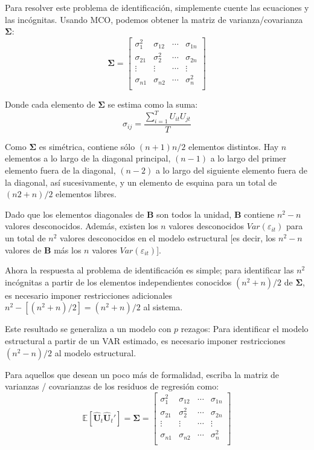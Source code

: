 \documentclass[
]{book}
\begin{document}
Para resolver este problema de identificación, simplemente cuente las ecuaciones y las incógnitas. Usando MCO, podemos obtener la matriz de varianza/covarianza \(\mathbf{\Sigma}\):
\begin{equation*}
    \mathbf{\Sigma} = 
    \begin{bmatrix}
    \sigma_1^2 & \sigma_{12} & \cdots & \sigma_{1n} \\ 
    \sigma_{21} & \sigma_2^2 & \cdots & \sigma_{2n} \\ 
    \vdots & \vdots & \cdots & \vdots \\ 
    \sigma_{n1} & \sigma_{n2} & \cdots & \sigma_n^2 \\ 
    \end{bmatrix}
\end{equation*}

Donde cada elemento de \(\mathbf{\Sigma}\) se estima como la suma:
\begin{equation*}
    \sigma_{ij} = \frac{\sum_{i = 1}^{T} U_{it} U_{jt} }{T}
\end{equation*}

Como \(\mathbf{\Sigma}\) es simétrica, contiene sólo \((n + 1)n/2\) elementos distintos. Hay \(n\) elementos a lo largo de la diagonal principal, \((n - 1)\) a lo largo del primer elemento fuera de la diagonal, \((n - 2)\) a lo largo del siguiente elemento fuera de la diagonal, así sucesivamente, y un elemento de esquina para un total de \((n2 + n)/2\) elementos libres.

Dado que los elementos diagonales de \(\mathbf{B}\) son todos la unidad, \(\mathbf{B}\) contiene \(n^2 - n\) valores desconocidos. Además, existen los \(n\) valores desconocidos \(Var(\varepsilon_{it})\) para un total de \(n^2\) valores desconocidos en el modelo estructural {[}es decir, los \(n^2 - n\) valores de \(\mathbf{B}\) más los \(n\) valores \(Var(\varepsilon_{it})\){]}.

Ahora la respuesta al problema de identificación es simple; para identificar las \(n^2\) incógnitas a partir de los elementos independientes conocidos \((n^2 + n)/2\) de \(\mathbf{\Sigma}\), es necesario imponer restricciones adicionales \(n^2 - [(n^2 + n)/2] = (n^2 + n)/2\) al sistema.

Este resultado se generaliza a un modelo con \(p\) rezagos: Para identificar el modelo estructural a partir de un VAR estimado, es necesario imponer restricciones \((n^2 - n)/2\) al modelo estructural.

Para aquellos que desean un poco más de formalidad, escriba la matriz de varianzas / covarianzas de los residuos de regresión como:
\begin{equation*}
    \mathbb{E}[\hat{\mathbf{U}}_{t} \hat{\mathbf{U}}_{t}'] = \mathbf{\Sigma} =
    \begin{bmatrix}
    \sigma_1^2 & \sigma_{12} & \cdots & \sigma_{1n} \\ 
    \sigma_{21} & \sigma_2^2 & \cdots & \sigma_{2n} \\ 
    \vdots & \vdots & \cdots & \vdots \\ 
    \sigma_{n1} & \sigma_{n2} & \cdots & \sigma_n^2 \\ 
    \end{bmatrix}
\end{equation*}
\end{document}
